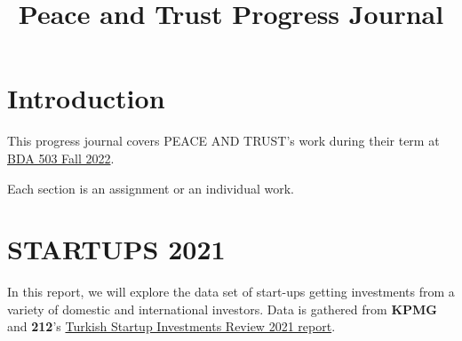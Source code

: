 \documentclass[
  letterpaper,
  DIV=11,
  numbers=noendperiod]{scrreprt}
\title{Peace and Trust Progress Journal}
\author{}
\date{}
\renewcommand*\contentsname{Table of contents}
\newcommand\contentsname{Table of contents}
\begin{document}
\maketitle
\ifdefined\Shaded\renewenvironment{Shaded}{\begin{tcolorbox}[frame hidden, enhanced, sharp corners, borderline west={3pt}{0pt}{shadecolor}, boxrule=0pt, interior hidden, breakable]}{\end{tcolorbox}}\fi

\renewcommand*\contentsname{Table of contents}
{
\hypersetup{linkcolor=}
\setcounter{tocdepth}{2}
\tableofcontents
}

\hypertarget{introduction}{%
\chapter*{Introduction}\label{introduction}}

This progress journal covers PEACE AND TRUST's work during their term at
\href{https://mef-bda503.github.io/fall22/}{BDA 503 Fall 2022}.

Each section is an assignment or an individual work.


\hypertarget{startups-2021}{%
\chapter{STARTUPS 2021}\label{startups-2021}}

In this report, we will explore the data set of start-ups getting
investments from a variety of domestic and international investors. Data
is gathered from \textbf{KPMG} and \textbf{212}'s
\href{https://assets.kpmg/content/dam/kpmg/tr/pdf/2022/03/turkish-startup-investments-review-2021.pdf}{Turkish
Startup Investments Review 2021 report}.
\end{document}
